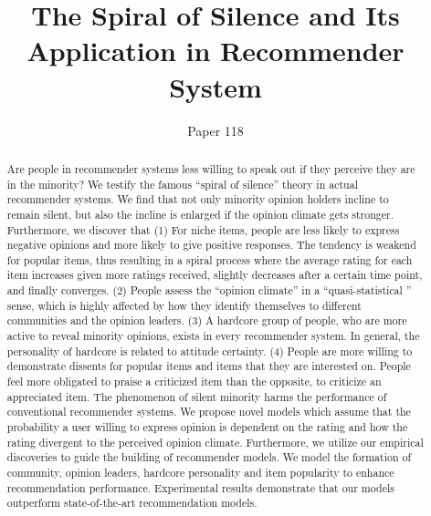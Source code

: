 \documentclass{sig-alternate}
\begin{document}
\title{The Spiral of Silence and Its Application in Recommender System}
\author{Paper 118}

\maketitle
\begin{abstract}
Are people in recommender systems less willing to speak out if they perceive they are in the minority? We testify the famous ``spiral of silence'' theory in actual recommender systems. We find that not only minority opinion holders incline to remain silent, but also the incline is enlarged if the opinion climate gets stronger. Furthermore, we discover that (1) For niche items, people are less likely to express negative opinions and more likely to give positive responses. The tendency is weakend for popular items, thus resulting in a spiral process where the average rating for each item increases given more ratings received, slightly decreases after a certain time point, and finally converges. (2) People assess the ``opinion climate'' in a ``quasi-statistical '' sense, which is highly affected by how they identify themselves to different communities and the opinion leaders. (3) A hardcore group of people, who are more active to reveal minority opinions, exists in every recommender system. In general, the personality of hardcore is related to attitude certainty.  (4) People are more willing to demonstrate dissents for popular items and items that they are interested on. People feel more obligated to praise a criticized item than the opposite, to criticize an appreciated item.  The phenomenon of silent minority harms the performance of conventional recommender systems. We propose novel models which assume that the probability a user willing to express opinion is dependent on the rating and how the rating divergent to the perceived opinion climate. Furthermore, we utilize our empirical discoveries to guide the building of recommender models. We model the formation of community, opinion leaders, hardcore personality and item popularity to enhance recommendation performance.  Experimental results demonstrate that our models  outperform state-of-the-art recommendation models.
\end{abstract}
\end{document}
